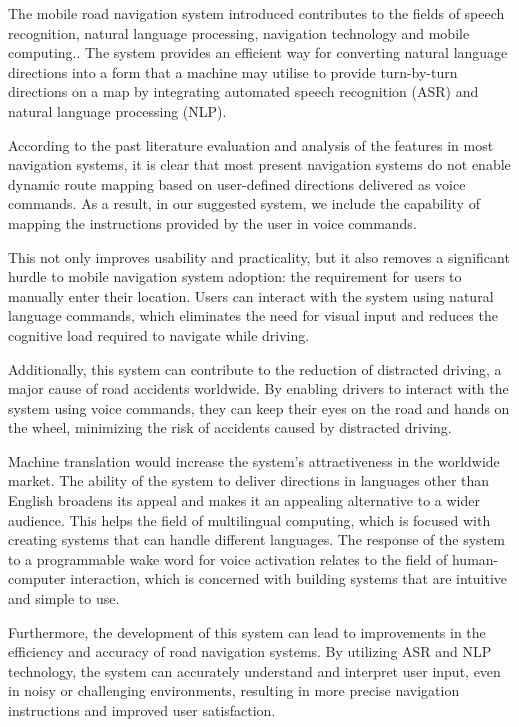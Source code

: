 \documentclass{epsrc}
\begin{document}
The mobile road navigation system introduced contributes to the fields of speech recognition, natural language processing, navigation technology and mobile computing.. The system provides an efficient way for converting natural language directions into a form that a machine may utilise to provide turn-by-turn directions on a map by integrating automated speech recognition (ASR) and natural language processing (NLP). 
\vspace{5pt}

According to the past literature evaluation and analysis of the features in most navigation systems, it is clear that most present navigation systems do not enable dynamic route mapping based on user-defined directions delivered as voice commands. As a result, in our suggested system, we include the capability of mapping the instructions provided by the user in voice commands.
\vspace{5pt}

This not only improves usability and practicality, but it also removes a significant hurdle to mobile navigation system adoption: the requirement for users to manually enter their location. Users can interact with the system using natural language commands, which eliminates the need for visual input and reduces the cognitive load required to navigate while driving.
\vspace{5pt}

Additionally, this system can contribute to the reduction of distracted driving, a major cause of road accidents worldwide. By enabling drivers to interact with the system using voice commands, they can keep their eyes on the road and hands on the wheel, minimizing the risk of accidents caused by distracted driving.
\vspace{5pt}

Machine translation would increase the system's attractiveness in the worldwide market. The ability of the system to deliver directions in languages other than English broadens its appeal and makes it an appealing alternative to a wider audience. This helps the field of multilingual computing, which is focused with creating systems that can handle different languages. The response of the system to a programmable wake word for voice activation relates to the field of human-computer interaction, which is concerned with building systems that are intuitive and simple to use.
\vspace{5pt}

Furthermore, the development of this system can lead to improvements in the efficiency and accuracy of road navigation systems. By utilizing ASR and NLP technology, the system can accurately understand and interpret user input, even in noisy or challenging environments, resulting in more precise navigation instructions and improved user satisfaction.
\vspace{5pt}
\end{document}
